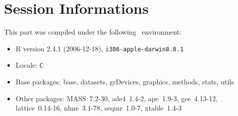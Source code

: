 \documentclass{article}
\begin{document}
\section{Session Informations}

This part was compiled under the following \Rlogo{}~environment:

\begin{itemize}
  \item R version 2.4.1 (2006-12-18), \verb|i386-apple-darwin8.8.1|
  \item Locale: \verb|C|
  \item Base packages: base, datasets, grDevices, graphics, methods,
    stats, utils
  \item Other packages: MASS~7.2-30, ade4~1.4-2, ape~1.9-3,
    gee~4.13-12, lattice~0.14-16, nlme~3.1-78, seqinr~1.0-7,
    xtable~1.4-3
\end{itemize}


\clearpage
{}


\end{document}
